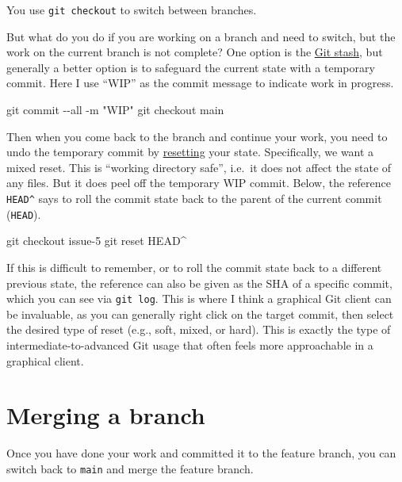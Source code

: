 \documentclass[
]{book}
\newenvironment{Shaded}{\begin{snugshade}}{\end{snugshade}}
\newcommand{\NormalTok}[1]{#1}
\begin{document}
You use \texttt{git\ checkout} to switch between branches.

But what do you do if you are working on a branch and need to switch,
but the work on the current branch is not complete?
One option is the \href{https://git-scm.com/book/en/v2/ch00/_git_stashing}{Git stash}, but generally a better option is to safeguard the current state with a temporary commit.
Here I use ``WIP'' as the commit message to indicate work in progress.

\begin{Shaded}
\begin{Highlighting}[]
\NormalTok{git commit {-}{-}all {-}m "WIP"}
\NormalTok{git checkout main}
\end{Highlighting}
\end{Shaded}

Then when you come back to the branch and continue your work, you
need to undo the temporary commit by \hyperref[reset]{resetting} your state.
Specifically, we want a mixed reset.
This is ``working directory safe'', i.e.~it does not affect the state of any files.
But it does peel off the temporary WIP commit.
Below, the reference \texttt{HEAD\^{}} says to roll the commit state back to the parent of the current commit (\texttt{HEAD}).

\begin{Shaded}
\begin{Highlighting}[]
\NormalTok{git checkout issue{-}5}
\NormalTok{git reset HEAD\^{}}
\end{Highlighting}
\end{Shaded}

If this is difficult to remember, or to roll the commit state back to a different previous state, the reference can also be given as the SHA of a specific commit, which you can see via \texttt{git\ log}.
This is where I think a graphical Git client can be invaluable, as you can generally right click on the target commit, then select the desired type of reset (e.g., soft, mixed, or hard).
This is exactly the type of intermediate-to-advanced Git usage that often feels more approachable in a graphical client.

\section{Merging a branch}\label{merging-a-branch}

Once you have done your work and committed it to the feature branch, you can switch back to \texttt{main} and merge the feature branch.
\end{document}
